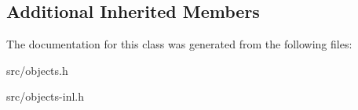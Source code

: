 \subsection*{Additional Inherited Members}


The documentation for this class was generated from the following files\+:\begin{DoxyCompactItemize}
\item 
src/objects.\+h\item 
src/objects-\/inl.\+h\end{DoxyCompactItemize}
